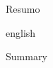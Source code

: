 \begin{resumo}
	\par Resumo
\end{resumo}

\begin{resumo}[Abstract]
	\begin{otherlanguage*}{english}
		\par Summary
	\end{otherlanguage*}
\end{resumo}
